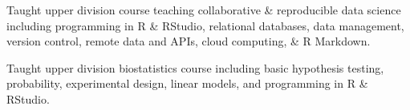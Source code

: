 \documentclass[a4]{deedy-resume-openfont}
\begin{document}
\begin{minipage}[t]{0.66\textwidth}
 
 Taught upper division course teaching collaborative \& reproducible data science including programming in R \& RStudio, relational databases, data management, version control, remote data and APIs, cloud computing, \& R Markdown. \href{https://espm-288.carlboettiger.info/}{\faGlobe} \href{https://github.com/ds421}{\faGithub}
\vspace{4pt}

	 
Taught upper division biostatistics course including basic hypothesis testing, probability, experimental design, linear models, and programming in R \& RStudio.
\end{minipage} 
\end{document}

